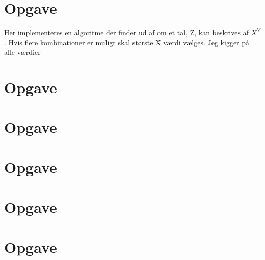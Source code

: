 \documentclass{article}
\begin{document}
\section{Opgave} %
Her implementeres en algoritme der finder ud af om et tal, Z, kan beskrives af $X^Y$. 
Hvis flere kombinationer er muligt skal største X værdi vælges.
Jeg kigger på alle værdier 

\section{Opgave} %

\section{Opgave} %

\section{Opgave} %

\section{Opgave} %

\section{Opgave} %
\end{document}
